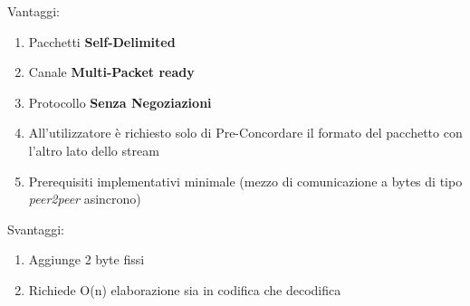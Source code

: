 \begin{multicols}{2}
	\begin{center}
		{\large \color{dkgreen}Vantaggi:}
	\end{center}
	\begin{spacing}{1.25}
		\begin{enumerate}[itemsep=-1mm]
			\item Pacchetti {\color{Azure}\textbf{Self-Delimited}}
			\item Canale {\color{Azure}\textbf{Multi-Packet ready}}
			\item Protocollo {\color{Azure}\textbf{Senza Negoziazioni}}
			\item All’utilizzatore è richiesto solo di Pre-Concordare il formato del pacchetto con l’altro lato dello stream
			\item Prerequisiti implementativi minimale (mezzo di comunicazione a bytes di tipo \textit{peer2peer} asincrono)
		\end{enumerate}
	\end{spacing}
	\vfill
	\columnbreak
	\begin{center}
		{\large \color{red} Svantaggi:}
	\end{center}
	\begin{spacing}{1.25}
		\begin{enumerate}[itemsep=-1mm]
			\item Aggiunge 2 byte fissi
			\item Richiede O(n) elaborazione sia in codifica che decodifica
		\end{enumerate}
	\end{spacing}
	\vspace*{\fill}
\end{multicols}

